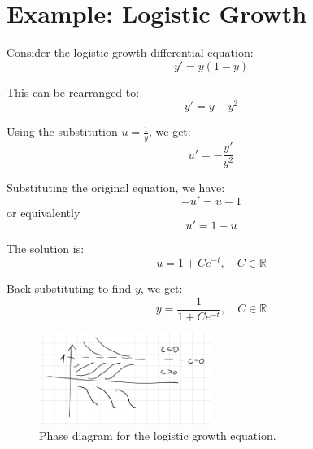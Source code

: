 \documentclass[11pt]{article}
\begin{document}
\section*{Example: Logistic Growth}

Consider the logistic growth differential equation:
\[ y' = y(1-y) \]

This can be rearranged to:
\[ y' = y - y^2 \]

Using the substitution \( u = \frac{1}{y} \), we get:
\[ u' = -\frac{y'}{y^2} \]

Substituting the original equation, we have:
\[ -u' = u - 1 \]
or equivalently
\[ u' = 1 - u \]

The solution is:
\[ u = 1 + Ce^{-t}, \quad C \in \mathbb{R} \]

Back substituting to find \( y \), we get:
\[ y = \frac{1}{1 + Ce^{-t}}, \quad C \in \mathbb{R} \]

\begin{figure}[h!]
\centering
\includegraphics[width=0.5\textwidth]{phase_diagram.png}
\caption{Phase diagram for the logistic growth equation.}
\end{figure}
\end{document}
